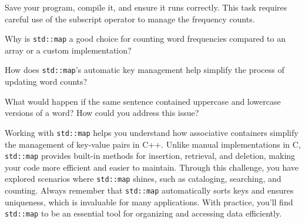\begin{challenge}
\begin{task}
        Save your program, compile it, and ensure it runs correctly. This task requires careful use of the subscript operator to manage the frequency counts.

        \begin{questions}
            \item Why is \texttt{std::map} a good choice for counting word frequencies compared to an array or a custom implementation?
            \item How does \texttt{std::map}'s automatic key management help simplify the process of updating word counts?
            \item What would happen if the same sentence contained uppercase and lowercase versions of a word? How could you address this issue?
        \end{questions}
    \end{task}

    \begin{advise}
        Working with \texttt{std::map} helps you understand how associative containers simplify the management of key-value pairs in C++. 
        Unlike manual implementations in C, \texttt{std::map} provides built-in methods for insertion, retrieval, and deletion, making your code more efficient and easier to maintain. 
        Through this challenge, you have explored scenarios where \texttt{std::map} shines, such as cataloging, searching, and counting. 
        Always remember that \texttt{std::map} automatically sorts keys and ensures uniqueness, which is invaluable for many applications. 
        With practice, you'll find \texttt{std::map} to be an essential tool for organizing and accessing data efficiently.
    \end{advise}
\end{challenge}
